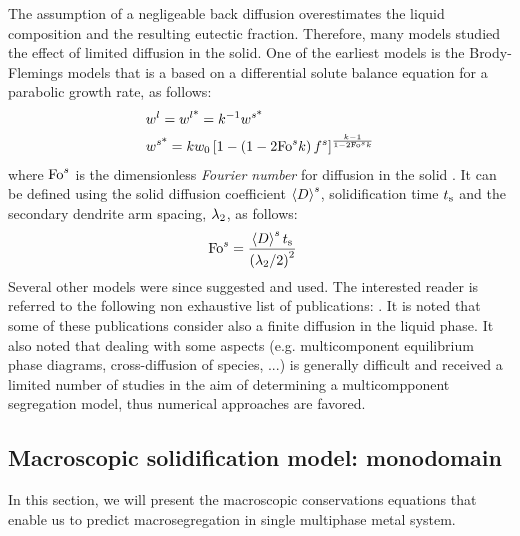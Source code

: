 The assumption of a negligeable back diffusion overestimates the liquid composition
and the resulting eutectic fraction. Therefore, many models studied the effect of limited diffusion in the solid. 
One of the earliest models is the Brody-Flemings models \citep{brody_solute_1966} that is a based on a differential solute balance equation for a parabolic growth rate, as follows:
\begin{align}
\label{eq:brodyflemings}
& {w}^l= {w}^{l \text{*}}  = k^{-1}  {w}^{s \text{*}}  \\
& {w}^{s \text{*}} = k {w}_0 \left[  1 - \left(  1 - 2 \text{Fo}^s k  \right) {f^s}  \right]^{\frac{k-1}{1 - 2 \text{Fo}^s k }}
\end{align}
where $\text{Fo}^s$ is the dimensionless \emph{Fourier number} for diffusion in the solid \citep{dantzig_solidification_2009}. 
It can be defined using the solid diffusion coefficient $\left \langle D \right \rangle^s$, solidification time $t_\text{s}$ and the secondary 
dendrite arm spacing, ${\lambda}_{2}$, as follows: 
\begin{align}
\label{eq:fouriersolid}
& \text{Fo}^s = \frac{\left \langle D \right \rangle^s t_\text{s}}{\left( {\lambda}_{2} / 2 \right)^2}
\end{align}
Several other models were since suggested and used. The interested reader is referred to the following non 
exhaustive list of publications: \citet{clyne_solute_1981,kobayashi_solute_1988,ni_volume-averaged_1991,wang_multiphase_1993,
combeau_modeling_1996,martorano_solutal_2003,tourret_generalized_2009}. It is noted that some of these publications consider 
also a finite diffusion in the liquid phase. It also noted that dealing with some aspects 
(e.g. multicomponent equilibrium phase diagrams, cross-diffusion of species, ...) is generally difficult
and received a limited number of studies in the aim of determining a multicompponent segregation model, thus numerical approaches are favored.

\subsection{Macroscopic solidification model: monodomain} \label{sec:monodomain}
In this section, we will present the macroscopic conservations equations that enable us to predict 
macrosegregation in single multiphase metal system.

 
